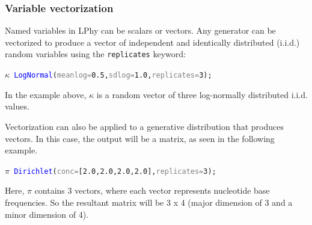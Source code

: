 \documentclass[10pt,letterpaper,table]{article}
\theoremstyle{definition}
\begin{document}



\subsubsection{Variable vectorization}

Named variables in LPhy can be scalars or vectors. Any generator can be vectorized to produce a vector of independent and identically distributed (i.i.d.) random variables using the \texttt{replicates} keyword:

{\small
\begin{alltt}
    \textcolor{bluishgreen}{\(\kappa\)} ~ \textcolor{blue}{LogNormal}(\textcolor{gray}{meanlog=}\textcolor{constant}{0.5}, \textcolor{gray}{sdlog=}\textcolor{constant}{1.0}, \textcolor{gray}{replicates=}\textcolor{constant}{3});
\end{alltt}
}

In the example above, $\kappa$ is a random vector of three log-normally distributed i.i.d. values.

Vectorization can also be applied to a generative distribution that produces vectors. In this case, the output will be a matrix, as seen in the following example. 

{\small
\begin{alltt}
      \textcolor{bluishgreen}{\(\pi\)} ~ \textcolor{blue}{Dirichlet}(\textcolor{gray}{conc=}[\textcolor{constant}{2.0}, \textcolor{constant}{2.0}, \textcolor{constant}{2.0}, \textcolor{constant}{2.0}], \textcolor{gray}{replicates=}\textcolor{constant}{3});
\end{alltt}
}
Here, $\pi$ contains 3 vectors, where each vector represents nucleotide base frequencies. 
So the resultant matrix will be 3 x 4 (major dimension of 3 and a minor dimension of 4). 
\end{document}
